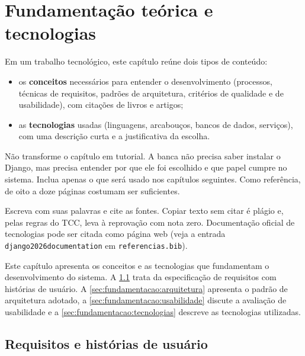 \chapter{Fundamentação teórica e tecnologias}
\label{cap:fundamentacao}

\begin{instrucao}
Em um trabalho tecnológico, este capítulo reúne dois tipos de conteúdo:
\begin{itemize}
  \item os \textbf{conceitos} necessários para entender o desenvolvimento
        (processos, técnicas de requisitos, padrões de arquitetura, critérios
        de qualidade e de usabilidade), com citações de livros e artigos;
  \item as \textbf{tecnologias} usadas (linguagens, arcabouços, bancos de
        dados, serviços), com uma descrição curta e a justificativa da escolha.
\end{itemize}
Não transforme o capítulo em tutorial. A banca não precisa saber instalar o
Django, mas precisa entender por que ele foi escolhido e que papel cumpre no
sistema. Inclua apenas o que será usado nos capítulos seguintes. Como
referência, de oito a doze páginas costumam ser suficientes.

Escreva com suas palavras e cite as fontes. Copiar texto sem citar é plágio e,
pelas regras do TCC, leva à reprovação com nota zero. Documentação oficial de
tecnologias pode ser citada como página web (veja a entrada
\verb|django2026documentation| em \verb|referencias.bib|).
\end{instrucao}

Este capítulo apresenta os conceitos e as tecnologias que fundamentam o
desenvolvimento do sistema. A \cref{sec:fundamentacao:requisitos} trata da
especificação de requisitos com histórias de usuário. A
\cref{sec:fundamentacao:arquitetura} apresenta o padrão de arquitetura
adotado, a \cref{sec:fundamentacao:usabilidade} discute a avaliação de
usabilidade e a \cref{sec:fundamentacao:tecnologias} descreve as tecnologias
utilizadas.

\section{Requisitos e histórias de usuário}
\label{sec:fundamentacao:requisitos}

